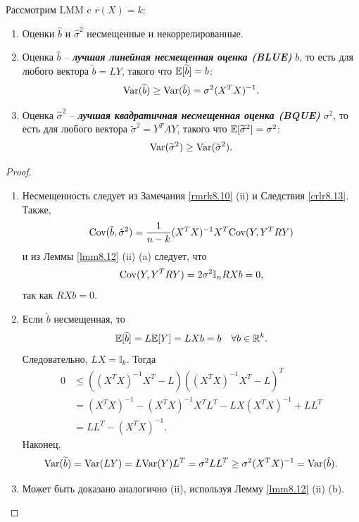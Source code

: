 \begin{thm} \label{Gauss-Markov}
	Рассмотрим LMM c $r(X) = k$:
	\begin{enumerate}
		\item Оценки $\hat{b}$ и $\hat{\sigma}^2$ несмещенные и некоррелированные.
		\item Оценка $\hat{b}$ -- \textbf{\textit{лучшая линейная несмещенная оценка (BLUE)}} $b$, то есть для любого вектора $\widetilde{b}=LY$, такого что $\mathbb{E}[\widetilde{b}] = b$:
		\[ \mathrm{Var}(\widetilde{b}) \geq \mathrm{Var}(\hat{b}) = \sigma^2(X^TX)^{-1}. \]
		\item Оценка $\hat{\sigma}^2$ -- \textbf{\textit{лучшая квадратичная несмещенная оценка (BQUE)}} $\sigma^2$, то есть для любого вектора $\widetilde{\sigma}^2 = Y^TAY$, такого что $\mathbb{E}[\widetilde{\sigma}^2] = \sigma^2$:
		\[ \mathrm{Var}(\widetilde{\sigma}^2) \geq \mathrm{Var}(\hat{\sigma}^2).  \]
	\end{enumerate}
\end{thm}
\begin{proof} \
	\begin{enumerate}
		\item Несмещенность следует из Замечания \ref{rmrk8.10} (ii) и Следствия \ref{crlr8.13}. Также,
		\[ \mathrm{Cov}(\hat{b}, \hat{\sigma}^2) = \frac{1}{n-k}(X^TX)^{-1}X^T \mathrm{Cov}(Y, Y^TRY) \]
		и из Леммы \ref{lmm8.12} (ii) (a) следует, что
		\[\mathrm{Cov}(Y, Y^TRY) = 2 \sigma^2 \mathbb{I}_n R Xb = 0,\]
		так как $RXb = 0$.
		\item Если $\widetilde{b}$ несмещенная, то
		\[ \mathbb{E}[\widetilde{b}] = L\mathbb{E}[Y] = LXb = b \quad \forall b \in \mathbb{R}^k. \]
		Следовательно, $LX = \mathbb{I}_k$. Тогда
		\[ \begin{aligned}
		0 & \leq ((X^TX)^{-1}X^T-L)((X^TX)^{-1}X^T-L)^T \\
		& = (X^TX)^{-1}-(X^TX)^{-1}X^TL^T-LX(X^TX)^{-1}+LL^T \\
		& = LL^T-(X^TX)^{-1}.
		\end{aligned}\]
		Наконец, 
		\[ \mathrm{Var}(\widetilde{b}) = \mathrm{Var}(LY) = L\mathrm{Var}(Y)L^T = \sigma^2 LL^T \geq \sigma^2 (X^TX)^{-1} = \mathrm{Var}(\hat{b}). \]
		\item Может быть доказано аналогично (ii), используя Лемму \ref{lmm8.12} (ii) (b).
	\end{enumerate}
\end{proof}

